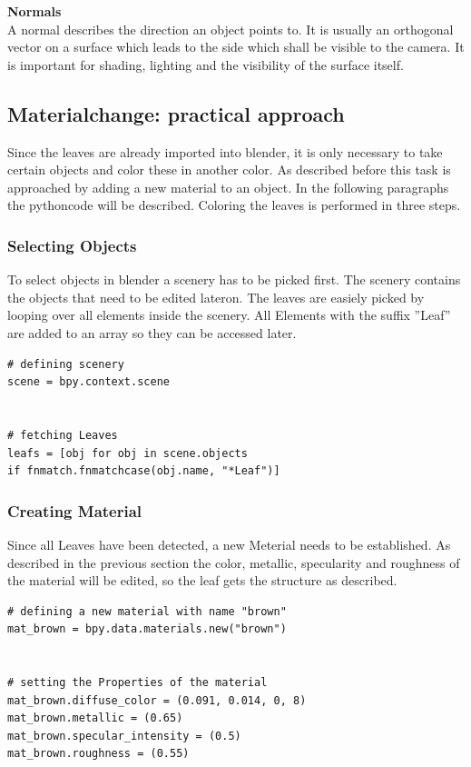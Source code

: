 \textbf{Normals} \\
A normal describes the direction an object points to. It is usually an orthogonal vector on a surface which leads to the side which shall be visible to the camera. It is important for shading, lighting  and the visibility of the surface itself.\\

\subsection{Materialchange: practical approach}

Since the leaves are already imported into blender, it is only necessary to take certain objects and color these in another color. As described before this task is approached by adding a new material to an object. In the following paragraphs the pythoncode will be described. \newline
Coloring the leaves is performed in three steps.


\subsubsection{Selecting Objects}
To select objects in blender a scenery has to be picked first. The scenery contains the objects that need to be edited lateron. The leaves are easiely picked by looping over all elements inside the scenery. All Elements with the suffix ''Leaf'' are added to an array so they can be accessed later.
\lstset{language=Python, frame=single}
\begin{lstlisting}
# defining scenery
scene = bpy.context.scene


# fetching Leaves
leafs = [obj for obj in scene.objects
if fnmatch.fnmatchcase(obj.name, "*Leaf")]
\end{lstlisting}

\subsubsection{Creating Material}
Since all Leaves have been detected, a new Meterial needs to be established. As described in the previous section the color, metallic, specularity and roughness of the material will be edited, so the leaf gets the structure as described.
\lstset{language=Python, frame=single}
\begin{lstlisting}
# defining a new material with name "brown"
mat_brown = bpy.data.materials.new("brown")


# setting the Properties of the material
mat_brown.diffuse_color = (0.091, 0.014, 0, 8)
mat_brown.metallic = (0.65)
mat_brown.specular_intensity = (0.5)
mat_brown.roughness = (0.55)
\end{lstlisting}

